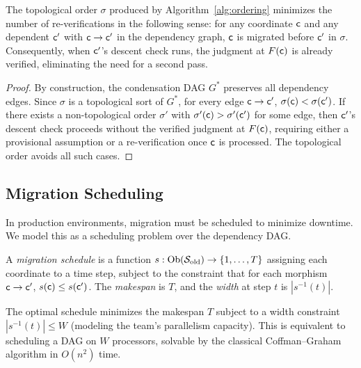 \documentclass[11pt]{article}
\newcommand{\SiteOld}{\Site_{\mathrm{old}}}
\newcommand{\FunctorF}{F}
\begin{document}
\begin{theorem}\label{thm:ordering}
The topological order $\sigma$ produced by Algorithm~\ref{alg:ordering}
minimizes the number of re-verifications in the following sense: for any
coordinate $\mathsf{c}$ and any dependent $\mathsf{c}'$ with
$\mathsf{c} \to \mathsf{c}'$ in the dependency graph, $\mathsf{c}$ is migrated
before $\mathsf{c}'$ in $\sigma$.  Consequently, when $\mathsf{c}'$'s descent
check runs, the judgment at $\FunctorF(\coord)$ is already verified,
eliminating the need for a second pass.
\end{theorem}

\begin{proof}
By construction, the condensation DAG $G^*$ preserves all dependency edges.
Since $\sigma$ is a topological sort of $G^*$, for every edge
$\mathsf{c} \to \mathsf{c}'$, $\sigma(\mathsf{c}) < \sigma(\mathsf{c}')$.  If there
exists a non-topological order $\sigma'$ with $\sigma'(\mathsf{c}) >
\sigma'(\mathsf{c}')$ for some edge, then $\mathsf{c}'$'s descent check
proceeds without the verified judgment at $\FunctorF(\coord)$, requiring
either a provisional assumption or a re-verification once $\mathsf{c}$ is
processed.  The topological order avoids all such cases.
\end{proof}

\subsection{Migration Scheduling}\label{sec:scheduling}

In production environments, migration must be scheduled to minimize
downtime.  We model this as a scheduling problem over the dependency DAG.

\begin{definition}\label{def:schedule}
A \emph{migration schedule} is a function
$s : \Ob(\SiteOld) \to \{1, \ldots, T\}$ assigning each coordinate to a
time step, subject to the constraint that for each morphism
$\mathsf{c} \to \mathsf{c}'$, $s(\mathsf{c}) \leq s(\mathsf{c}')$.  The \emph{makespan}
is $T$, and the \emph{width} at step $t$ is $|s^{-1}(t)|$.
\end{definition}

The optimal schedule minimizes the makespan $T$ subject to a width
constraint $|s^{-1}(t)| \leq W$ (modeling the team's parallelism capacity).
This is equivalent to scheduling a DAG on $W$ processors, solvable by the
classical Coffman--Graham algorithm in $O(n^2)$ time.
\end{document}
